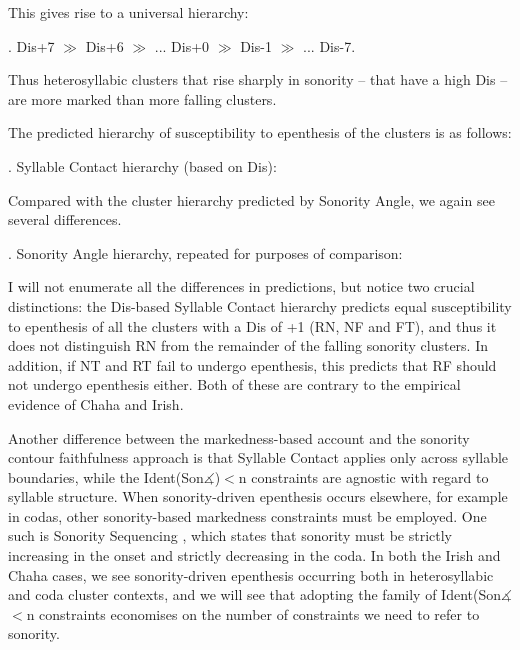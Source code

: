 \documentclass[12pt]{article}
\begin{document}
This gives rise to a universal hierarchy:

\ex. {\sc *Dis+7} $\gg$ {\sc *Dis+6} $\gg$ ... {\sc *Dis+0} $\gg$ {\sc *Dis-1} $\gg$ ... {\sc *Dis-7}.

Thus heterosyllabic clusters that rise sharply in sonority -- that have a high {\sc Dis} -- are more marked than more falling clusters.

The predicted hierarchy of susceptibility to epenthesis of the clusters is as follows:

\ex. Syllable Contact hierarchy (based on {\sc *Dis}):

\vspace{-3em}
\noindent \resizebox{\linewidth}{!}{\usebox{\syllablecontacthierarchy}}

\bigskip

Compared with the cluster hierarchy predicted by {\sc Sonority Angle}, we again see several differences.

\ex. {\sc Sonority Angle} hierarchy, repeated for purposes of comparison:

\noindent \resizebox{\linewidth}{!}{\usebox{\sonorityanglehierarchycompressed}}

\vspace{-1em}

I will not enumerate all the differences in predictions, but notice two crucial distinctions: the {\sc Dis}-based Syllable Contact hierarchy predicts equal susceptibility to epenthesis of all the clusters with a {\sc Dis} of +1 (RN, NF and FT), and thus it does not distinguish RN from the remainder of the falling sonority clusters. In addition, if NT and RT fail to undergo epenthesis, this predicts that RF should not undergo epenthesis either. Both of these are contrary to the empirical evidence of Chaha and Irish.

\bigskip

Another difference between the markedness-based account and the sonority contour faithfulness approach is that Syllable Contact applies only across syllable boundaries, while the {\sc Ident(Son$\measuredangle$)}$<$n constraints are agnostic with regard to syllable structure. When sonority-driven epenthesis occurs elsewhere, for example in codas, other sonority-based markedness constraints must be employed.  One such is Sonority Sequencing \citep{selkirk.1984}, which states that sonority must be strictly increasing in the onset and strictly decreasing in the coda. In both the Irish and Chaha cases, we see sonority-driven epenthesis occurring both in heterosyllabic and coda cluster contexts, and we will see that adopting the family of {\sc Ident(Son$\measuredangle$}$<$n constraints economises on the number of constraints we need to refer to sonority.
\end{document}
